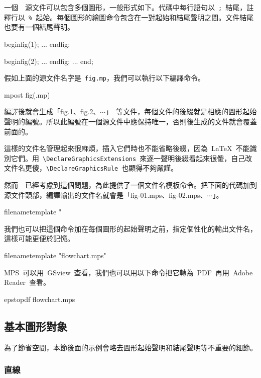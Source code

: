 一個~\MP~源文件可以包含多個圖形，一般形式如下。代碼中每行語句以~\verb|;|~結尾，註釋行以~\verb|%|~起始。每個圖形的繪圖命令包含在一對起始和結尾聲明之間。文件結尾也要有一個結尾聲明。
\begin{code}
beginfig(1); %
...          %
endfig;      %

beginfig(2);
...
endfig;
...
end;         %
\end{code}

假如上面的源文件名字是~\verb|fig.mp|，我們可以執行以下編譯命令。
\begin{code}
mpost fig(.mp)
\end{code}

編譯後就會生成「fig.1、fig.2、$\cdots$」~等文件，每個文件的後綴就是相應的圖形起始聲明的編號。所以此編號在一個源文件中應保持唯一，否則後生成的文件就會覆蓋前面的。

這樣的文件名管理起來很麻煩，插入它們時也不能省略後綴，因為~\LaTeX~不能識別它們。用~\verb|\DeclareGraphicsExtensions|~來逐一聲明後綴看起來很傻，自己改文件名更傻，\verb|\DeclareGraphicsRule|~也顯得不夠嚴謹。

然而~\MP~已經考慮到這個問題，為此提供了一個文件名模板命令。把下面的代碼加到源文件頭部，編譯輸出的文件名就會是「fig-01.mps、fig-02.mps、$\cdots$」。
\begin{code}
filenametemplate "%
\end{code}

我們也可以把這個命令加在每個圖形的起始聲明之前，指定個性化的輸出文件名，這樣可能更便於記憶。
\begin{code}
filenametemplate "flowchart.mps" %
\end{code}

MPS~可以用~GSview~查看，我們也可以用以下命令把它轉為~PDF~再用~Adobe Reader~查看。

\begin{code}
epstopdf flowchart.mps
\end{code}

\subsection{基本圖形對象}
為了節省空間，本節後面的示例會略去圖形起始聲明和結尾聲明等不重要的細節。

\subsubsection{直線}

